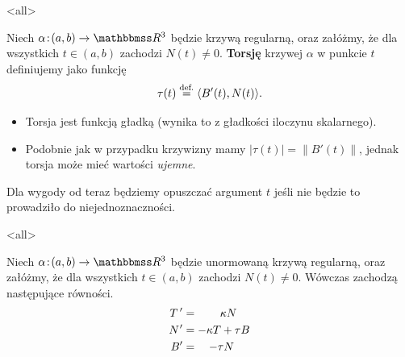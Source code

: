\mode<all>{}
\begin{frame}[<+->]
\begin{definicja}
Niech $\alpha\colon (a,b)\to \R^3$ będzie krzywą regularną, oraz załóżmy, że dla wszystkich $t\in (a,b)$ zachodzi $N(t)\neq 0$. \textbf{Torsję} krzywej $\alpha$ w punkcie $t$ definiujemy jako funkcję \[\tau(t)\define \langle B'(t),N(t)\rangle.\]
\end{definicja}

\begin{uwaga}
\begin{itemize}
\item Torsja jest funkcją gładką (wynika to z gładkości iloczynu skalarnego).
\item Podobnie jak w przypadku krzywizny mamy $|\tau(t)|=\|B'(t)\|$, jednak torsja może mieć wartości \textit{ujemne}.
\end{itemize}
\end{uwaga}

\end{frame}
\begin{frame}[<+->]

\begin{uwaga}
Dla wygody od teraz będziemy opuszczać argument $t$ jeśli nie będzie to prowadziło do niejednoznaczności.
\end{uwaga}

\end{frame}
\mode<all>{}
\begin{frame}[<+->]
\begin{twierdzenie} Niech $\alpha\colon (a,b)\to \R^3$ będzie unormowaną krzywą regularną, oraz załóżmy, że dla wszystkich $t\in (a,b)$ zachodzi $N(t)\neq 0$. Wówczas zachodzą następujące równości.
\begin{align}
T\,'	&= \qquad\kappa N \label{eqn:frenet1} \\
N\hspace{0.5pt}'	&= -\kappa T + \tau B\label{eqn:frenet2}\\
B'	&= \quad-\tau N\label{eqn:frenet3}
\end{align}

\end{twierdzenie}

\end{frame}
